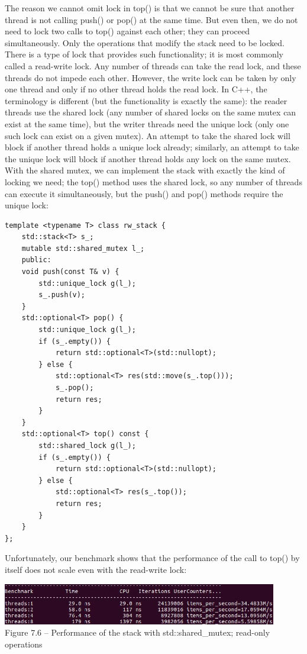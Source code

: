 The reason we cannot omit lock in top() is that we cannot be sure that another thread is not calling push() or pop() at the same time. But even then, we do not need to lock two calls to top() against each other; they can proceed simultaneously. Only the operations that modify the stack need to be locked. There is a type of lock that provides such functionality; it is most commonly called a read-write lock. Any number of threads can take the read lock, and these threads do not impede each other. However, the write lock can be taken by only one thread and only if no other thread holds the read lock. In C++, the terminology is different (but the functionality is exactly the same): the reader threads use the shared lock (any number of shared locks on the same mutex can exist at the same time), but the writer threads need the unique lock (only one such lock can exist on a given mutex). An attempt to take the shared lock will block if another thread holds a unique lock already; similarly, an attempt to take the unique lock will block if another thread holds any lock on the same mutex. With the shared mutex, we can implement the stack with exactly the kind of locking we need; the top() method uses the shared lock, so any number of threads can execute it simultaneously, but the push() and pop() methods require the unique lock:

\begin{lstlisting}[style=styleCXX]
template <typename T> class rw_stack {
	std::stack<T> s_;
	mutable std::shared_mutex l_;
	public:
	void push(const T& v) {
		std::unique_lock g(l_);
		s_.push(v);
	}
	std::optional<T> pop() {
		std::unique_lock g(l_);
		if (s_.empty()) {
			return std::optional<T>(std::nullopt);
		} else {
			std::optional<T> res(std::move(s_.top()));
			s_.pop();
			return res;
		}
	}
	std::optional<T> top() const {
		std::shared_lock g(l_);
		if (s_.empty()) {
			return std::optional<T>(std::nullopt);
		} else {
			std::optional<T> res(s_.top());
			return res;
		}
	}
};
\end{lstlisting}

Unfortunately, our benchmark shows that the performance of the call to top() by itself does not scale even with the read-write lock:

\begin{center}
\includegraphics[width=0.9\textwidth]{content/2/chapter7/images/6.jpg}\\
Figure 7.6 – Performance of the stack with std::shared\_mutex; read-only operations
\end{center}

